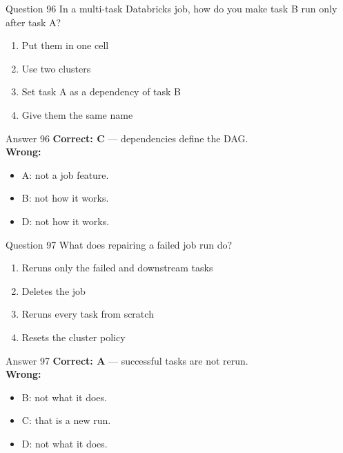 \documentclass[aspectratio=169,11pt]{beamer}
\begin{document}
\begin{frame}{Question 96}
In a multi-task Databricks job, how do you make task B run only after task A?
\begin{enumerate}[label=\Alph*.]
\item Put them in one cell
\item Use two clusters
\item Set task A as a dependency of task B
\item Give them the same name
\end{enumerate}
\end{frame}
\begin{frame}{Answer 96}
\textbf{Correct: C} --- dependencies define the DAG.\\
\vspace{0.5em}
\textbf{Wrong:}
\begin{itemize}
\item A: not a job feature.
\item B: not how it works.
\item D: not how it works.
\end{itemize}
\end{frame}

\begin{frame}{Question 97}
What does repairing a failed job run do?
\begin{enumerate}[label=\Alph*.]
\item Reruns only the failed and downstream tasks
\item Deletes the job
\item Reruns every task from scratch
\item Resets the cluster policy
\end{enumerate}
\end{frame}
\begin{frame}{Answer 97}
\textbf{Correct: A} --- successful tasks are not rerun.\\
\vspace{0.5em}
\textbf{Wrong:}
\begin{itemize}
\item B: not what it does.
\item C: that is a new run.
\item D: not what it does.
\end{itemize}
\end{frame}
\end{document}
